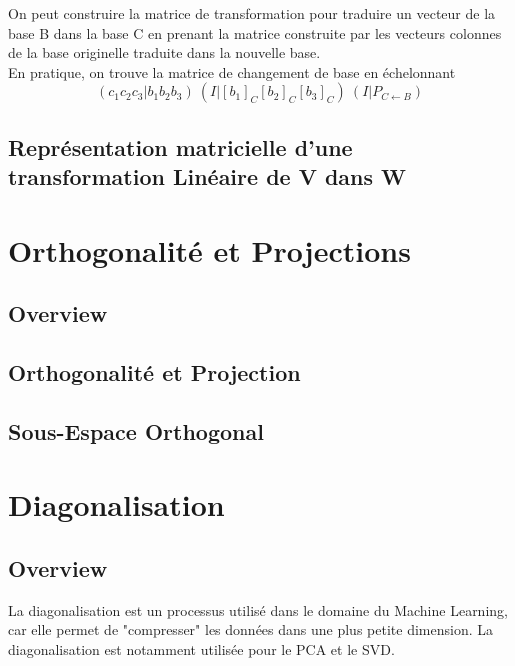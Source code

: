 \documentclass{article}
\begin{document}
\begin{remark}
    On peut construire la matrice de transformation pour traduire un
    vecteur de la base B dans la base C en prenant la matrice construite
    par les vecteurs colonnes de la base originelle traduite dans la
    nouvelle base.\\
    En pratique, on trouve la matrice de changement de base en échelonnant
    $$ (c_1 c_2 c_3 | b_1 b_2 b_3) ~ (I | [b_1]_C [b_2]_C [b_3]_C)
    ~ (I | P_{C \leftarrow B})$$
\end{remark}

\begin{remark}

\end{remark}

\subsection{Représentation matricielle d'une transformation Linéaire de V
dans W}

\pagebreak
\section{Orthogonalité et Projections}
\subsection{Overview}

\subsection{Orthogonalité et Projection}
\subsection{Sous-Espace Orthogonal}

\pagebreak

\section{Diagonalisation}
\subsection{Overview}

La diagonalisation est un processus utilisé dans le domaine du Machine Learning,
car elle permet de "compresser" les données dans une plus petite dimension. La
diagonalisation est notamment utilisée pour le PCA et le SVD.\\
\end{document}

